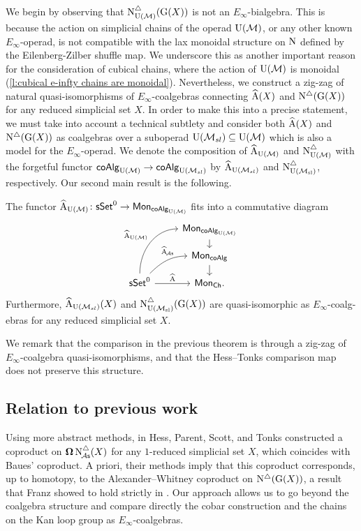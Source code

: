 We begin by observing that $\operatorname{N^{\triangle}_{{\operatorname{U}(\mathcal{M})}}}(\operatorname{G}(X))$ is not an $E_\infty$-bialgebra.
This is because the action on simplicial chains of the operad ${\operatorname{U}(\mathcal{M})}$, or any other known $E_\infty$-operad, is not compatible with the lax monoidal structure on $\operatorname{N}$ defined by the Eilenberg-Zilber shuffle map.
We underscore this as another important reason for the consideration of cubical chains, where the action of ${\operatorname{U}(\mathcal{M})}$ is monoidal (\cref{l:cubical e-infty chains are monoidal}).
Nevertheless, we construct a zig-zag of natural quasi-isomorphisms of $E_{\infty}$-coalgebras connecting $\operatorname{\widehat{A}}(X)$ and $\operatorname{N^{\triangle}}(\operatorname{G}(X))$ for any reduced simplicial set $X$.
In order to make this into a precise statement, we must take into account a technical subtlety and consider both $\operatorname{\widehat{A}}(X)$ and $\operatorname{N^{\triangle}}(\operatorname{G}(X))$ as coalgebras over a suboperad ${\operatorname{U}(\mathcal{M}_{sl})} \subseteq {\operatorname{U}(\mathcal{M})}$ which is also a model for the $E_\infty$-operad.
We denote the composition of $\operatorname{\widehat{A}_{{\operatorname{U}(\mathcal{M})}}}$ and $\operatorname{N^{\triangle}_{{\operatorname{U}(\mathcal{M})}}}$ with the forgetful functor $\mathsf{coAlg}_{\operatorname{U}(\mathcal{M})} \to \mathsf{coAlg}_{\operatorname{U}(\mathcal{M}_{sl})}$ by $\operatorname{\widehat{A}}_{\operatorname{U}(\mathcal{M}_{sl})}$ and $\operatorname{N^{\triangle}_{{\operatorname{U}(\mathcal{M}_{sl})}}}$, respectively.
Our second main result is the following.

\begin{theorem} \label{t:2nd main thm in the intro}
	The functor $\operatorname{\widehat{A}_{{\operatorname{U}(\mathcal{M})}}} \colon \mathsf{sSet}^0 \to \mathsf{Mon}_{\mathsf{coAlg}_{\operatorname{U}(\mathcal{M})}}$ fits into a commutative diagram
	\[
	\begin{tikzcd}[row sep=small]
	& \Mon_{\coAlg_\UM} \arrow[d] \\
	& \Mon_{\coAlg} \arrow[d] \\
	\sSet^0
	\arrow[r, "\adamsE", ]
	\arrow[ru, "\adamsEA", out=45, in=180, near end]
	\arrow[ruu, "\adamsEUM", out=90, in=180]
	& \Mon_{\Ch}.
	\end{tikzcd}
	\]
	Furthermore, $\operatorname{\widehat{A}}_{\operatorname{U}(\mathcal{M}_{sl})}(X)$ and $\operatorname{N^{\triangle}_{{\operatorname{U}(\mathcal{M}_{sl})}}}(\operatorname{G}(X))$ are quasi-isomorphic as $E_\infty$-coalg-ebras for any reduced simplicial set $X$.
\end{theorem}

We remark that the comparison in the previous theorem is through a zig-zag of $E_\infty$-coalgebra quasi-isomorphisms, and that the Hess--Tonks comparison map does not preserve this structure.

\subsection*{Relation to previous work}

Using more abstract methods, in \cite{hess2006adamshilton} Hess, Parent, Scott, and Tonks constructed a coproduct on $\operatorname{\mathbf{\Omega}} \operatorname{N^{\triangle}_{\!{\mathcal{A}\mathsf{s}}}}(X)$ for any $1$-reduced simplicial set $X$, which coincides with Baues' coproduct.
A priori, their methods imply that this coproduct corresponds, up to homotopy, to the Alexander--Whitney coproduct on $\operatorname{N^{\triangle}}(\operatorname{G}(X))$, a result that Franz showed to hold strictly in \cite{franz2020szczarba}.
Our approach allows us to go beyond the coalgebra structure and compare directly the cobar construction and the chains on the Kan loop group as $E_{\infty}$-coalgebras.

